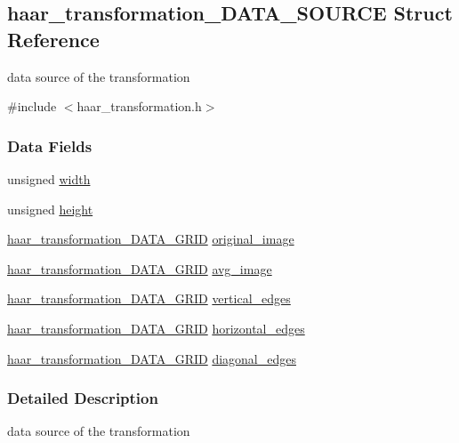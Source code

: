 \hypertarget{a00001}{\subsection{haar\-\_\-transformation\-\_\-\-D\-A\-T\-A\-\_\-\-S\-O\-U\-R\-C\-E Struct Reference}
\label{a00001}
}


data source of the transformation  




{\ttfamily \#include $<$haar\-\_\-transformation.\-h$>$}

\subsubsection*{Data Fields}
\begin{DoxyCompactItemize}
\item 
unsigned \hyperlink{a00001_a5a1fcebbd5511855a4fb6c0562799a62}{width}
\item 
unsigned \hyperlink{a00001_a19602f03626b3fa6057df5c682da07bc}{height}
\item 
\hyperlink{a00009_a15c000e971023d4dd5ea1540870dad05}{haar\-\_\-transformation\-\_\-\-D\-A\-T\-A\-\_\-\-G\-R\-I\-D} \hyperlink{a00001_a203562228c38ad021a474ea532e5dc4f}{original\-\_\-image}
\item 
\hyperlink{a00009_a15c000e971023d4dd5ea1540870dad05}{haar\-\_\-transformation\-\_\-\-D\-A\-T\-A\-\_\-\-G\-R\-I\-D} \hyperlink{a00001_a7c9cba7121efaf248e28958aff45dee6}{avg\-\_\-image}
\item 
\hyperlink{a00009_a15c000e971023d4dd5ea1540870dad05}{haar\-\_\-transformation\-\_\-\-D\-A\-T\-A\-\_\-\-G\-R\-I\-D} \hyperlink{a00001_a33ea3d2963d128108e2273f3d2de151d}{vertical\-\_\-edges}
\item 
\hyperlink{a00009_a15c000e971023d4dd5ea1540870dad05}{haar\-\_\-transformation\-\_\-\-D\-A\-T\-A\-\_\-\-G\-R\-I\-D} \hyperlink{a00001_ae9a30f00b69fe14e3617c94cb1c2cf1c}{horizontal\-\_\-edges}
\item 
\hyperlink{a00009_a15c000e971023d4dd5ea1540870dad05}{haar\-\_\-transformation\-\_\-\-D\-A\-T\-A\-\_\-\-G\-R\-I\-D} \hyperlink{a00001_a6ebe476a92a4970ecf7b1e240298ebe1}{diagonal\-\_\-edges}
\end{DoxyCompactItemize}


\subsubsection{Detailed Description}
data source of the transformation 

